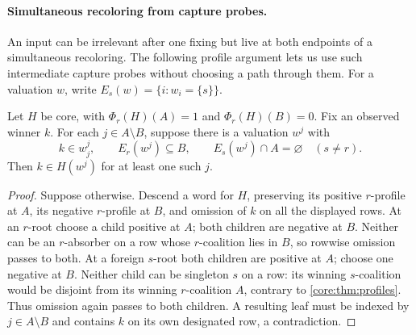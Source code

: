 \paragraph{Simultaneous recoloring from capture probes.}
An input can be irrelevant after one fixing but live at both endpoints
of a simultaneous recoloring. The following profile argument lets us
use such intermediate capture probes without choosing a path through them.
For a valuation $w$, write $E_s(w)=\{i:w_i=\{s\}\}$.

\begin{lemma}
\label{core:lem:marked-profile-transfer}
Let $H$ be core, with $\Phi_r(H)(A)=1$ and $\Phi_r(H)(B)=0$.
Fix an observed winner $k$. For each $j\in A\setminus B$, suppose
there is a valuation $w^j$ with
\[
 k\in w^j_j,\qquad E_r(w^j)\subseteq B,\qquad
 E_s(w^j)\cap A=\varnothing\quad(s\ne r).
\]
Then $k\in H(w^j)$ for at least one such $j$.
\end{lemma}
\begin{proof}
Suppose otherwise. Descend a word for $H$, preserving its positive
$r$-profile at $A$, its negative $r$-profile at $B$, and omission of
$k$ on all the displayed rows.
At an $r$-root choose a child positive at $A$; both children are
negative at $B$. Neither can be an $r$-absorber on a row whose
$r$-coalition lies in $B$, so rowwise omission passes to both.
At a foreign $s$-root both children are positive at $A$; choose one
negative at $B$. Neither child can be singleton $s$ on a row:
its winning $s$-coalition would be disjoint from its winning
$r$-coalition $A$, contrary to \cref{core:thm:profiles}.
Thus omission again passes to both children.
A resulting leaf must be indexed by $j\in A\setminus B$ and
contains $k$ on its own designated row, a contradiction.
\end{proof}


